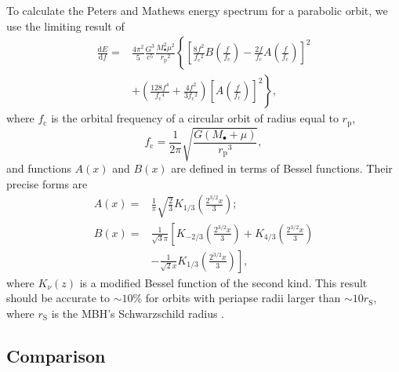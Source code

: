 \documentclass[useAMS,usedcolumn,usegraphicx,usenatbib]{mn2e}
\newcommand{\sub}[1]{\ensuremath{_\mathrm{#1}}}
\newcommand{\dd}{\ensuremath{\mathrm{d}}}
\newcommand{\diff}[2]{\ensuremath{\frac{\dd {#1}}{\dd {#2}}}}
\newcommand{\recip}[1]{\ensuremath{\frac{1}{#1}}}
\begin{document}
To calculate the Peters and Mathews energy spectrum for a parabolic orbit, we use the limiting result of \citet{Turner1977}
\begin{align}
\diff{E}{f} = {} & \frac{4\pi^2}{5}\frac{G^3}{c^5}\frac{M_\bullet^2\mu^2}{r\sub{p}^2}\left\{\left[\frac{8f^2}{f\sub{c}^2}B\left(\frac{f}{f\sub{c}}\right) - \frac{2f}{f\sub{c}}A\left(\frac{f}{f\sub{c}}\right)\right]^2 \right. \nonumber \\
 & \left. + \left(\frac{128f^4}{f\sub{c}^4} + \frac{4f^2}{3f\sub{c}^2}\right)\left[A\left(\frac{f}{f\sub{c}}\right)\right]^2\right\},
\label{eq:PM_dEdf}
\end{align}
where $f\sub{c}$ is the orbital frequency of a circular orbit of radius equal to $r\sub{p}$,
\begin{equation}
f\sub{c} = \recip{2\pi}\sqrt{\frac{G(M_\bullet + \mu)}{r\sub{p}^3}},
\end{equation}
and functions $A\left(x\right)$ and $B\left(x\right)$ are defined in terms of Bessel functions. Their precise forms are \citep{Berry2010}
\begin{align}
A\left(x\right) = {} & \recip{\pi}\sqrt{\frac{2}{3}}K_{1/3}\left(\frac{2^{3/2}x}{3}\right); \\
B\left(x\right) = {} & \recip{\sqrt{3}\pi}\left[K_{-2/3}\left(\frac{2^{3/2}x}{3}\right) + K_{4/3}\left(\frac{2^{3/2}x}{3}\right) \right. \nonumber \\
 {} & - \left. \recip{\sqrt{2}x}K_{1/3}\left(\frac{2^{3/2}x}{3}\right)\right],
\end{align}
where $K_\nu(z)$ is a modified Bessel function of the second kind. This result should be accurate to $\sim10\%$ for orbits with periapse radii larger than $\sim10r\sub{S}$, where $r\sub{S}$ is the MBH's Schwarzschild radius \citep{Berry2010}.

\subsection{Comparison}
\end{document}
